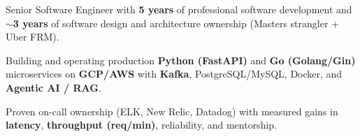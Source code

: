 \begin{zitemize}
    \item Senior Software Engineer with \textbf{5 years} of professional software development and \textbf{$\sim$3 years} of software design and architecture ownership (Masters strangler + Uber FRM).
    \item Building and operating production \textbf{Python (FastAPI)} and \textbf{Go (Golang/Gin)} microservices on \textbf{GCP/AWS} with \textbf{Kafka}, PostgreSQL/MySQL, Docker, and \textbf{Agentic AI / RAG}.
    \item Proven on-call ownership (ELK, New Relic, Datadog) with measured gains in \textbf{latency}, \textbf{throughput (req/min)}, reliability, and mentorship.
\end{zitemize}
